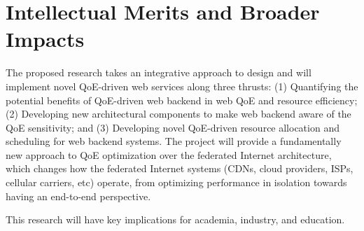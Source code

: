 \section{Intellectual Merits and Broader Impacts}

The proposed research takes an integrative approach to design and will implement novel QoE-driven web services along three thrusts: 
(1) Quantifying the potential benefits of QoE-driven web backend in web QoE and resource efficiency;
(2) Developing new architectural components to make web backend aware of the QoE sensitivity; and
(3) Developing novel QoE-driven resource allocation and scheduling for web backend systems. %
The project will provide a fundamentally new approach to QoE optimization over the federated Internet architecture, which changes how the federated Internet systems (CDNs, cloud providers, ISPs, cellular carriers, etc) operate, from optimizing performance in isolation towards having an end-to-end perspective.

This research
will have key implications for academia, industry, and education.


